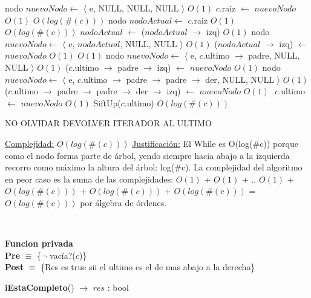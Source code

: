 \begin{Algoritmos}
\begin{algorithm}[H]
\begin{algorithmic}[1]
        \State nodo $nuevoNodo \gets$ $\langle$ e, NULL, NULL, NULL $\rangle$   \Comment $O(1)$
        \State $c$.raiz $\gets$ $nuevoNodo$ \Comment $O(1)$
    \Else
          \Comment $O(log(\#(c)))$
            \State nodo $nodoActual \gets$ $c$.raiz \Comment $O(1)$
              \Comment $O(log(\#(c)))$
                \State $nodoActual$ $\gets$ ($nodoActual$ $\to$ izq)  \Comment $O(1)$
            \EndWhile
            \State nodo $nuevoNodo \gets$ $\langle$ e, $nodoActual$, NULL, NULL $\rangle$   \Comment $O(1)$
            \State ($nodoActual$ $\to$ izq) $\gets$ $nuevoNodo$ \Comment $O(1)$
        \Else
              \Comment $O(1)$
                \State nodo $nuevoNodo \gets$ $\langle$ e, $c$.ultimo $\to$ padre, NULL, NULL $\rangle$   \Comment $O(1)$
                \State ($c$.ultimo $\to$ padre $\to$ izq) $\gets$ $nuevoNodo$ \Comment $O(1)$
            \Else %
                \State nodo $nuevoNodo \gets$ $\langle$ e, $c$.ultimo $\to$ padre $\to$ padre $\to$ der, NULL, NULL $\rangle$   \Comment $O(1)$
                \State ($c$.ultimo $\to$ padre $\to$ padre $\to$ der $\to$ izq) $\gets$ $nuevoNodo$ \Comment $O(1)$
            \EndIf
        \EndIf
    \EndIf
    \State $ $
    \State $c$.ultimo $\gets$ $nuevoNodo$ \Comment $O(1)$   
    \State SiftUp($c$.ultimo) \Comment $O(log(\#(c)))$

    NO OLVIDAR DEVOLVER ITERADOR AL ULTIMO

    \medskip
    \Statex \underline{Complejidad:} $O(log(\#(c)))$
    \Statex \underline{Justificaci\'on:} El While es O(log($\#$c)) porque como el nodo forma parte de \'arbol, yendo siempre hacia abajo a la izquierda recorro como m\'aximo la altura del \'arbol: log($\#$c). La complejidad del algoritmo en peor caso es la suma de las complejidades: $O(1)$ + $O(1)$ + .. $O(1)$ + $O(log(\#(c)))$ + $O(log(\#(c)))$ + $O(log(\#(c)))$ = $O(log(\#(c)))$ por \'algebra de \'ordenes.
\end{algorithmic}
\end{algorithm}
 





$ $\newline
$ $\newline

\textbf{Funcion privada}\\
\textbf{Pre} $\equiv$ \{$\neg$ vac\'ia?($c$)\}\\%
\textbf{Post} $\equiv$ \{Res es true sii el ultimo es el de mas abajo a la derecha\}%
\begin{algorithm}[H]
{\textbf{iEstaCompleto}() $\to$ $res$ : bool}
\begin{algorithmic}[1]
    

\end{algorithmic}
\end{algorithm}
\end{Algoritmos}
